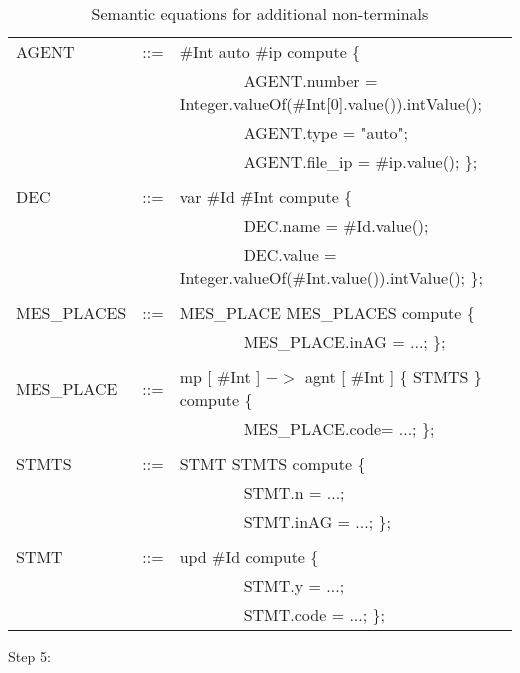\documentclass[preprint, prX]{revtex4}
\begin{document}
\begin{table}[htb]           \caption{Semantic equations for additional non-terminals}
\label{tab:tab25}
\vspace{-5mm}
\footnotesize
\begin{center}
\begin{tabular}{ | l  l  l | }
\hline
AGENT & ::= & \#Int auto \#ip \; compute \{ \\
 & &  \ \ \ \ \ \ \ \ AGENT.number = Integer.valueOf(\#Int[0].value()).intValue(); \\
 & &  \ \ \ \ \ \ \ \ AGENT.type = "auto"; \\
 & &  \ \ \ \ \ \ \ \ AGENT.file\_ip = \#ip.value(); \}; \\
 & & \\
DEC & ::= & var \#Id \:\=  \#Int \; compute \{ \\
 & &  \ \ \ \ \ \ \ \ DEC.name = \#Id.value(); \\
 & &  \ \ \ \ \ \ \ \ DEC.value = Integer.valueOf(\#Int.value()).intValue(); \}; \\
 & & \\
MES\_PLACES & ::= & MES\_PLACE MES\_PLACES compute \{ \\
 & &  \ \ \ \ \ \ \ \ MES\_PLACE.inAG = ...; \}; \\
 & & \\
MES\_PLACE & ::= & mp [ \#Int ] $->$  agnt [ \#Int ] \{ STMTS \} compute \{ \\
 & &  \ \ \ \ \ \ \ \ MES\_PLACE.code= ...; \}; \\
 & & \\
STMTS & ::= & STMT STMTS compute \{ \\
 & &  \ \ \ \ \ \ \ \ STMT.n = ...; \\
 & &  \ \ \ \ \ \ \ \ STMT.inAG = ...; \}; \\
 & & \\
STMT & ::= & upd  \#Id \; compute \{ \\
 & &  \ \ \ \ \ \ \ \ STMT.y =  ...; \\
 & &  \ \ \ \ \ \ \ \ STMT.code = ...; \}; \\
\hline
\end{tabular}
\end{center}
\normalsize
\vspace{-5mm}
\end{table}


Step 5:
\end{document}
